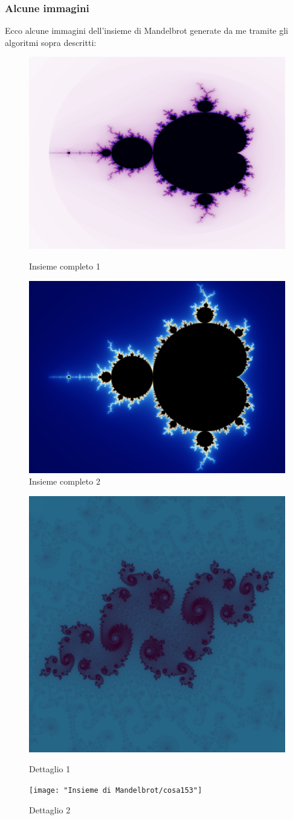 \documentclass[10pt]{report}
\begin{document}
			\subsubsection{Alcune immagini}
				Ecco alcune immagini dell'insieme di Mandelbrot generate da me tramite gli algoritmi sopra descritti:
				\begin{figure}[H]
					\centering
					\includegraphics[width=0.5\linewidth]{"Insieme di Mandelbrot/basic_mandelbrot2"}
					\caption*{ \footnotesize{Insieme completo 1} }
					\label{fig:basic_mandelbrot1}
					\endminipage \hfill
					\centering
					\includegraphics[width=0.5\linewidth]{"Insieme di Mandelbrot/mandelbrot_set"}
					\caption*{ \footnotesize{Insieme completo 2} }
					\label{fig:basic_mandelbrot2}
					\endminipage \hfill
				\end{figure}
				\begin{figure}[H]
					\centering
					\includegraphics[width=0.5\linewidth]{"Insieme di Mandelbrot/detail1"}
					\caption*{ \footnotesize{Dettaglio 1} }
					\label{fig:detail1}
					\endminipage \hfill
					\centering
					\texttt{[image: "Insieme di Mandelbrot/cosa153"]}
					\caption*{ \footnotesize{Dettaglio 2} }
					\label{fig:detail2}
					\endminipage 
				\end{figure}
\end{document}
